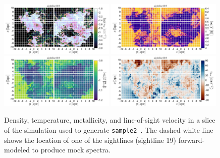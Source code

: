 \documentclass[fleqn,usenatbib]{mnras}
\begin{document}
\begin{figure}
    \centering
    \includegraphics[width=0.49\textwidth]{figures/sample2/projections/density_projection_maps_SL_19.jpg}
    \includegraphics[width=0.49\textwidth]{figures/sample2/projections/temperature_projection_maps_SL_19.jpg} \\
    \includegraphics[width=0.49\textwidth]{figures/sample2/projections/metallicity_projection_maps_SL_19.jpg}
    \includegraphics[width=0.49\textwidth]{figures/sample2/projections/velocity_projection_maps_SL_19.jpg}
    \caption{
    Density, temperature, metallicity, and line-of-sight velocity in a slice of the simulation used to generate \texttt{sample2}~\citep{mandelker2020Instability}.
    The dashed white line shows the location of one of the sightlines (sightline 19) forward-modeled to produce mock spectra.
    }
    \label{f: sample2 ray 19}
\end{figure}
\end{document}
